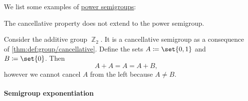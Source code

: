 \begin{example}\label{ex:def:power_semigroup}
  We list some examples of \hyperref[def:power_semigroup]{power semigroups}:
  \begin{thmenum}
     The cancellative property does not extend to the power semigroup.

    Consider the additive group \hyperref[def:group_of_integers_modulo]{\( \BbbZ_2 \)}. It is a cancellative semigroup as a consequence of \cref{thm:def:group/cancellative}. Define the sets \( A \coloneqq \set{ 0, 1 } \) and \( B \coloneqq \set{ 0 } \). Then
    \begin{equation*}
      A + A = A = A + B,
    \end{equation*}
    however we cannot cancel \( A \) from the left because \( A \neq B \).
  \end{thmenum}
\end{example}

\paragraph{Semigroup exponentiation}

